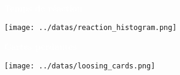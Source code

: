 \documentclass[a4paper,11pt,landscape]{article}
\begin{document}
\begin{multicols}{2}
     \noindent
    \begin{tcolorbox}[colback=ora2,colframe=ora2]
        \begin{tcolorbox}[colback=ora1,colframe=ora1]
            \centering \textcolor{white}{\textbf{Temps de réaction}}
        \end{tcolorbox}
            \centering \texttt{[image: ../datas/reaction\_histogram.png]}

    \end{tcolorbox}
    \vfill

     \noindent
    \begin{tcolorbox}[colback=ora2,colframe=ora2]
        \begin{tcolorbox}[colback=ora1,colframe=ora1]
            \centering \textcolor{white}{\textbf{Cartes perdantes}}
        \end{tcolorbox}
            \centering \texttt{[image: ../datas/loosing\_cards.png]}

    \end{tcolorbox}
    \vfill
\end{multicols}
\end{document}

